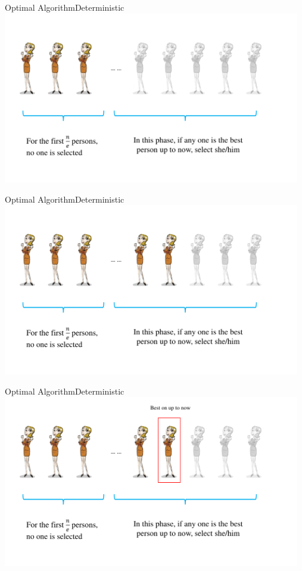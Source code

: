 \documentclass{beamer}
\begin{document}
\begin{frame}{Optimal Algorithm}{Deterministic}
	\centering\includegraphics[width=13cm]{Problems/present-2}
\end{frame}

\begin{frame}{Optimal Algorithm}{Deterministic}
	\centering\includegraphics[width=13cm]{Problems/present-3}
\end{frame}
\begin{frame}{Optimal Algorithm}{Deterministic}
	\centering\includegraphics[width=13cm]{Problems/present-4}
\end{frame}
\end{document}
